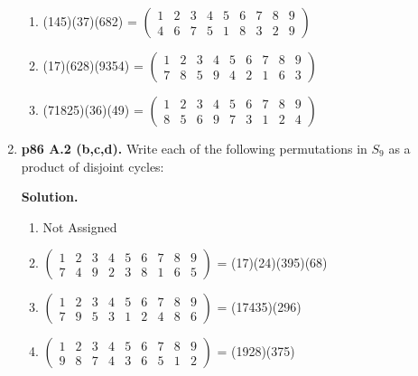 \documentclass[11pt]{article}
\begin{document}
\begin{enumerate}
\begin{enumerate}
		\item (145)(37)(682) =
		$\begin{pmatrix}
			1 & 2 & 3 & 4 & 5 & 6 & 7 & 8 & 9 \\
			4 & 6 & 7 & 5 & 1 & 8 & 3 & 2 & 9
		\end{pmatrix}$
		
		\item (17)(628)(9354) =
		$\begin{pmatrix}
			1 & 2 & 3 & 4 & 5 & 6 & 7 & 8 & 9 \\
			7 & 8 & 5 & 9 & 4 & 2 & 1 & 6 & 3
		\end{pmatrix}$
		
		\item (71825)(36)(49) =
		$\begin{pmatrix}
			1 & 2 & 3 & 4 & 5 & 6 & 7 & 8 & 9 \\
			8 & 5 & 6 & 9 & 7 & 3 & 1 & 2 & 4
		\end{pmatrix}$
  
  \end{enumerate}

\item {\bfseries p86 A.2 (b,c,d).} Write each of the following permutations in $S_9$ as a product of disjoint cycles:
  
	{\bfseries Solution.}
	
	\begin{enumerate}
	
		\item Not Assigned
	
		\item 
		$\begin{pmatrix}
			1 & 2 & 3 & 4 & 5 & 6 & 7 & 8 & 9 \\
			7 & 4 & 9 & 2 & 3 & 8 & 1 & 6 & 5
		\end{pmatrix}$
		= (17)(24)(395)(68)
		
		\item 
		$\begin{pmatrix}
			1 & 2 & 3 & 4 & 5 & 6 & 7 & 8 & 9 \\
			7 & 9 & 5 & 3 & 1 & 2 & 4 & 8 & 6
		\end{pmatrix}$
		= (17435)(296)
		
		\item 
		$\begin{pmatrix}
			1 & 2 & 3 & 4 & 5 & 6 & 7 & 8 & 9 \\
			9 & 8 & 7 & 4 & 3 & 6 & 5 & 1 & 2
		\end{pmatrix}$
		= (1928)(375)
  

\end{enumerate}
\end{enumerate}
\end{document}
